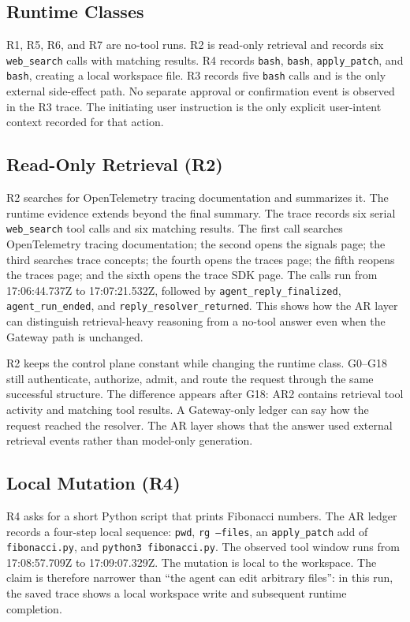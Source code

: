 \documentclass[11pt,a4paper]{article}
\begin{document}
\subsection{Runtime Classes}

R1, R5, R6, and R7 are no-tool runs. R2 is read-only retrieval and records
six \texttt{web\_search} calls with matching results. R4 records
\texttt{bash}, \texttt{bash}, \texttt{apply\_patch}, and \texttt{bash},
creating a local workspace file. R3 records five \texttt{bash} calls and
is the only external side-effect path. No separate approval or
confirmation event is observed in the R3 trace. The initiating user
instruction is the only explicit user-intent context recorded for that
action.

\subsection{Read-Only Retrieval (R2)}

R2 searches for OpenTelemetry tracing documentation and summarizes it.
The runtime evidence extends beyond the final summary. The trace records
six serial \texttt{web\_search} tool calls and six matching results. The
first call searches OpenTelemetry tracing documentation; the
second opens the signals page; the third searches trace concepts; the
fourth opens the traces page; the fifth reopens the traces page; and the
sixth opens the trace SDK page. The calls run from 17:06:44.737Z to
17:07:21.532Z, followed by \texttt{agent\_reply\_finalized},
\texttt{agent\_run\_ended}, and \texttt{reply\_resolver\_returned}. This
shows how the AR layer can distinguish retrieval-heavy reasoning from a
no-tool answer even when the Gateway path is unchanged.

R2 keeps the control plane constant while changing the runtime class.
G0--G18 still authenticate, authorize, admit, and route the request
through the same successful structure. The difference appears after G18:
AR2 contains retrieval tool activity and matching tool results. A
Gateway-only ledger can say how the request reached the resolver. The AR
layer shows that the answer used external retrieval events rather than
model-only generation.

\subsection{Local Mutation (R4)}

R4 asks for a short Python script that prints Fibonacci numbers. The AR
ledger records a four-step local sequence: \texttt{pwd}, \texttt{rg
--files}, an \texttt{apply\_patch} add of \texttt{fibonacci.py}, and
\texttt{python3 fibonacci.py}. The observed tool window runs from
17:08:57.709Z to 17:09:07.329Z. The mutation is local to the workspace.
The claim is therefore narrower than ``the agent can edit arbitrary
files'': in this run, the saved trace shows a local workspace write and
subsequent runtime completion.
\end{document}
